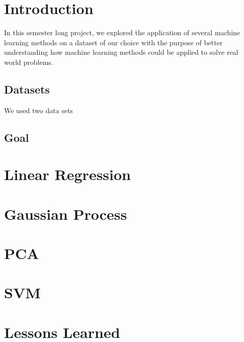 \documentclass[11pt]{article}
\begin{document}
\section{Introduction}
In this semester long project, we explored the application of several machine learning methods on a dataset of our choice with the purpose of better understanding how machine learning methods could be applied to solve real world problems. 
\subsection{Datasets} 
We used two data sets
\subsection{Goal}

\section{Linear Regression}

\section{Gaussian Process}
\section{PCA}
\section{SVM}
\section{Lessons Learned}
\end{document}
